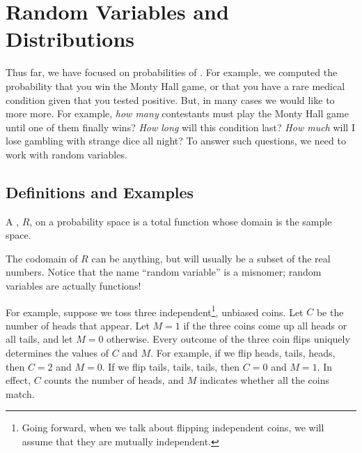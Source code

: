 \chapter{Random Variables and Distributions}\label{ran_var_chap}

Thus far, we have focused on probabilities of .  For
example, we computed the probability that you win the Monty Hall game,
or that you have a rare medical condition given that you tested
positive.  But, in many cases we would like to more more.  For
example, \emph{how many} contestants must play the Monty Hall game
until one of them finally wins?  \emph{How long} will this condition
last?  \emph{How much} will I lose gambling with strange dice all
night?  To answer such questions, we need to work with random
variables.

\section{Definitions and Examples}\label{ran_var_examples_sec}

\begin{definition}
  A , $R$, on a probability space is a total function
  whose domain is the sample space.
\end{definition}
The codomain of $R$ can be anything, but will usually be a subset of
the real numbers.  Notice that the name ``random variable'' is a
misnomer; random variables are actually functions!

For example, suppose we toss three independent\footnote{Going forward,
  when we talk about flipping independent coins, we will assume that
  they are mutually independent.}, unbiased coins.  Let $C$ be the
number of heads that appear.  Let $M = 1$ if the three coins come up
all heads or all tails, and let $M = 0$ otherwise.  Every outcome of
the three coin flips uniquely determines the values of $C$ and $M$.
For example, if we flip heads, tails, heads, then $C = 2$ and $M = 0$.
If we flip tails, tails, tails, then $C = 0$ and $M = 1$.  In effect,
$C$ counts the number of heads, and $M$ indicates whether all the
coins match.

